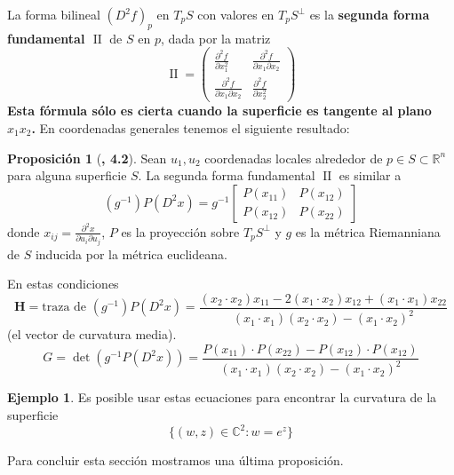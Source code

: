 \documentclass[spanish]{book}
\theoremstyle{definition}
\newtheorem*{prop}{Proposición}
\newtheorem*{ejem}{Ejemplo}
\newcommand{\R}{\mathbb{R}}
\newcommand{\C}{\mathbb{C}}
\begin{document}
		La forma bilineal $(D^2f)_p$ en $T_pS$ con valores en $T_pS^\perp$ es la \textbf{segunda forma fundamental $\operatorname{II}$} de $S$ en $p$, dada por la matriz
		\[\operatorname{II}= 
		\begin{pmatrix}
			\frac{\partial^2 f}{\partial x^2_1}&\frac{\partial^2f}{\partial x_1\partial x_2}\\
			\frac{\partial^2f}{\partial x_1\partial x_2}&\frac{\partial^2f}{\partial x_2^2}
		\end{pmatrix}\]
		\textbf{Esta fórmula sólo es cierta cuando la superficie es tangente al plano $x_1x_2$.} En coordenadas generales tenemos el siguiente resultado:
\begin{prop}[\cite{Morgan}\textbf{, 4.2}]
		Sean $u_1,u_2$ coordenadas locales alrededor de $p\in S\subset\R^n$ para alguna superficie $S$. La segunda forma fundamental $\operatorname{II}$ es similar a
		\[(g^{-1})P(D^2x)=g^{-1}\left[\begin{matrix}
			P(x_{11})&P(x_{12})\\
			P(x_{12})&P(x_{22})
		\end{matrix}\right]\]
		donde $x_{ij}=\frac{\partial^2x}{\partial u_i\partial u_j}$, $P$ es la proyección sobre $T_pS^\perp$ y $g$ es la métrica Riemanniana de $S$ inducida por la métrica euclideana.
		
		En estas condiciones
		\[ \mathbf{H} = \text{traza de }(g^{-1})P(D^2x) = \frac{{(x_2 \cdot x_2) x_{11} - 2(x_1 \cdot x_2) x_{12} + (x_1 \cdot x_1) x_{22}}}{{(x_1 \cdot x_1)(x_2 \cdot x_2) - (x_1 \cdot x_2)^2}} \]
		(el vector de curvatura media).
\[ G = \det(g^{-1}P(D^2x)) = \frac{{P(x_{11}) \cdot P(x_{22}) - P(x_{12}) \cdot P(x_{12})}}{{(x_1 \cdot x_1)(x_2 \cdot x_2) - (x_1 \cdot x_2)^2}} \]
	\end{prop}
\begin{ejem}
	Es posible usar estas ecuaciones para encontrar la curvatura de la superficie
	\[\{(w,z)\in\C^2:w=e^z\}\]
\end{ejem}

%

Para concluir esta sección mostramos una última proposición.
\end{document}
